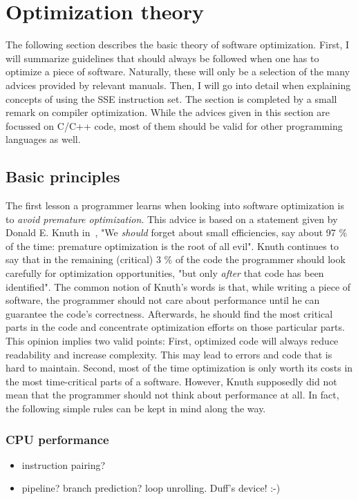 \section{Optimization theory}
\label{Optimization_theory}
The following section describes the basic theory of software optimization. First, I will summarize guidelines that should always be followed when one has to optimize a piece of software. Naturally, these will only be a selection of the many advices provided by relevant manuals. Then, I will go into detail when explaining concepts of using the SSE instruction set. The section is completed by a small remark on compiler optimization. While the advices given in this section are focussed on C/C++ code, most of them should be valid for other programming languages as well.
\subsection{Basic principles}
The first lesson a programmer learns when looking into software optimization is to \emph{avoid premature optimization}. This advice is based on a statement given by Donald E. Knuth in~\cite{knuth1974}, "We \emph{should} forget about small efficiencies, say about 97 \% of the time: premature optimization is the root of all evil". Knuth continues to say that in the remaining (critical) 3 \% of the code the programmer should look carefully for optimization opportunities, "but only \emph{after} that code has been identified". The common notion of Knuth's words is that, while writing a piece of software, the programmer should not care about performance until he can guarantee the code's correctness. Afterwards, he should find the most critical parts in the code and concentrate optimization efforts on those particular parts. This opinion implies two valid points: First, optimized code will always reduce readability and increase complexity. This may lead to errors and code that is hard to maintain. Second, most of the time optimization is only worth its costs in the most time-critical parts of a software. However, Knuth supposedly did not mean that the programmer should not think about performance at all. In fact, the following simple rules can be kept in mind along the way.
\subsubsection{CPU performance}
\begin{itemize}
\item instruction pairing?
\item pipeline? branch prediction? loop unrolling. Duff's device! :-)
\end{itemize}
